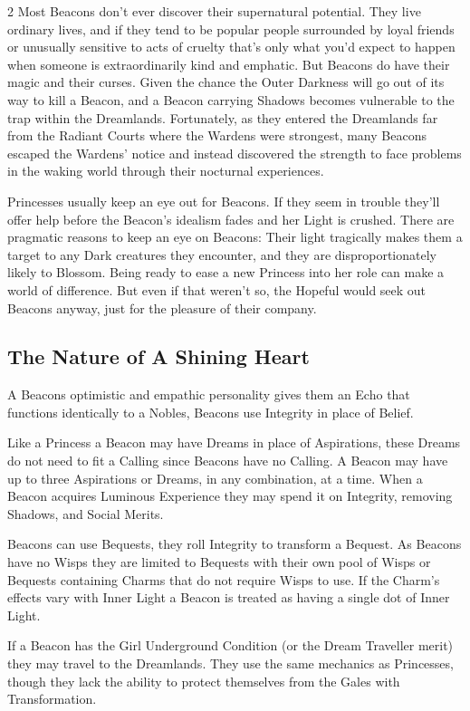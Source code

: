 \begin{multicols}{2}
Most Beacons don’t ever discover their supernatural potential. They live ordinary lives, and if they tend to be popular people surrounded by loyal friends or unusually sensitive to acts of cruelty that’s only what you'd expect to happen when someone is extraordinarily kind and emphatic. But Beacons do have their magic and their curses. Given the chance the Outer Darkness will go out of its way to kill a Beacon, and a Beacon carrying Shadows becomes vulnerable to the trap within the Dreamlands. Fortunately, as they entered the Dreamlands far from the Radiant Courts where the Wardens were strongest, many Beacons escaped the Wardens’ notice and instead discovered the strength to face problems in the waking world through their nocturnal experiences. 

Princesses usually keep an eye out for Beacons. If they seem in trouble they’ll offer help before the Beacon’s idealism fades and her Light is crushed. There are pragmatic reasons to keep an eye on Beacons: Their light tragically makes them a target to any Dark creatures they encounter, and they are disproportionately likely to Blossom. Being ready to ease a new Princess into her role can make a world of difference. But even if that weren’t so, the Hopeful would seek out Beacons anyway, just for the pleasure of their company.

\subsection*{The Nature of A Shining Heart}

A Beacons optimistic and empathic personality gives them an Echo that functions identically to a Nobles, Beacons use Integrity in place of Belief.

Like a Princess a Beacon may have Dreams in place of Aspirations, these Dreams do not need to fit a Calling since Beacons have no Calling. A Beacon may have up to three Aspirations or Dreams, in any combination, at a time. When a Beacon acquires Luminous Experience they may spend it on Integrity, removing Shadows, and Social Merits.

Beacons can use Bequests, they roll Integrity to transform a Bequest. As Beacons have no Wisps they are limited to Bequests with their own pool of Wisps or Bequests containing Charms that do not require Wisps to use. If the Charm's effects vary with Inner Light a Beacon is treated as having a single dot of Inner Light.

If a Beacon has the Girl Underground Condition (or the Dream Traveller merit) they may travel to the Dreamlands. They use the same mechanics as Princesses, though they lack the ability to protect themselves from the Gales with Transformation.


\end{multicols}
